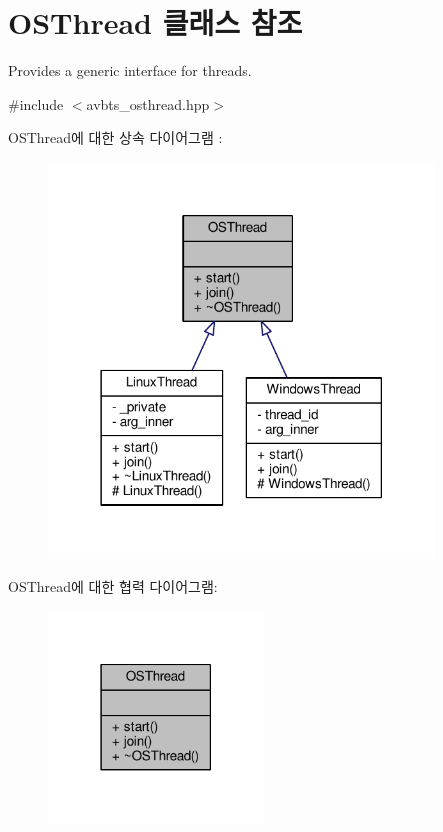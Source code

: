\hypertarget{class_o_s_thread}{}\section{O\+S\+Thread 클래스 참조}
\label{class_o_s_thread}


Provides a generic interface for threads.  




{\ttfamily \#include $<$avbts\+\_\+osthread.\+hpp$>$}



O\+S\+Thread에 대한 상속 다이어그램 \+: 
\nopagebreak
\begin{figure}[H]
\begin{center}
\leavevmode
\includegraphics[width=290pt]{class_o_s_thread__inherit__graph}
\end{center}
\end{figure}


O\+S\+Thread에 대한 협력 다이어그램\+:
\nopagebreak
\begin{figure}[H]
\begin{center}
\leavevmode
\includegraphics[width=162pt]{class_o_s_thread__coll__graph}
\end{center}
\end{figure}
